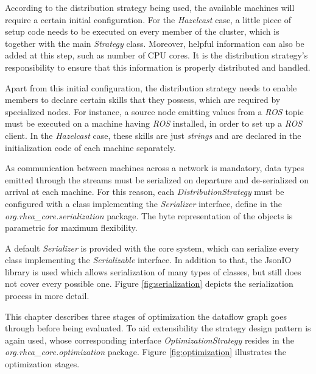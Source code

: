 \documentclass{dithesis}
\begin{document}


According to the distribution strategy being used, the available machines will require a certain initial configuration. For the \textit{Hazelcast} case, a little piece of setup code needs to be executed on every member of the cluster, which is together with the main \textit{Strategy} class. Moreover, helpful information can also be added at this step, such as number of CPU cores. It is the distribution strategy's responsibility to ensure that this information is properly distributed and handled.

Apart from this initial configuration, the distribution strategy needs to enable members to declare certain skills that they possess, which are required by specialized nodes. For instance, a source node emitting values from a \textit{ROS} topic must be executed on a machine having \textit{ROS} installed, in order to set up a \textit{ROS} client. In the \textit{Hazelcast} case, these skills are just \textit{strings} and are declared in the initialization code of each machine separately.


As communication between machines across a network is mandatory, data types emitted through the streams must be serialized on departure and de-serialized on arrival at each machine. For this reason, each \textit{DistributionStrategy} must be configured with a class implementing the \textit{Serializer} interface, define in the \textit{org.rhea\_core.serialization} package. The byte representation of the objects is parametric for maximum flexibility. 

A default \textit{Serializer} is provided with the core system, which can serialize every class implementing the \textit{Serializable} interface. In addition to that, the JsonIO library\cite{json_io} is used which allows serialization of many types of classes, but still does not cover every possible one. Figure \ref{fig:serialization} depicts the serialization process in more detail.



This chapter describes three stages of optimization the dataflow graph goes through before being evaluated. To aid extensibility  the strategy design pattern is again used, whose corresponding interface \textit{OptimizationStrategy} resides in the \textit{org.rhea\_core.optimization} package. Figure \ref{fig:optimization} illustrates the optimization stages.
\end{document}
